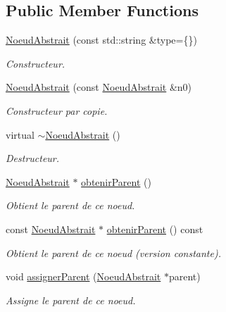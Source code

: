 \subsection*{Public Member Functions}
\begin{DoxyCompactItemize}
\item 
\hyperlink{group__inf2990_gad1eae42fe2bccef56f55b8a52726657f}{Noeud\+Abstrait} (const std\+::string \&type=\{\})
\begin{DoxyCompactList}\small\item\em Constructeur. \end{DoxyCompactList}\item 
\hyperlink{group__inf2990_gae7bea8d23c4dad60c334fc6806d08d01}{Noeud\+Abstrait} (const \hyperlink{class_noeud_abstrait}{Noeud\+Abstrait} \&n0)
\begin{DoxyCompactList}\small\item\em Constructeur par copie. \end{DoxyCompactList}\item 
virtual \hyperlink{group__inf2990_ga0ab3f7ab838e8349113da5074abcdc3a}{$\sim$\+Noeud\+Abstrait} ()
\begin{DoxyCompactList}\small\item\em Destructeur. \end{DoxyCompactList}\item 
\hyperlink{class_noeud_abstrait}{Noeud\+Abstrait} $\ast$ \hyperlink{group__inf2990_gaa2ac8c4cd02d88c312b92c65e07ed6d9}{obtenir\+Parent} ()
\begin{DoxyCompactList}\small\item\em Obtient le parent de ce noeud. \end{DoxyCompactList}\item 
const \hyperlink{class_noeud_abstrait}{Noeud\+Abstrait} $\ast$ \hyperlink{group__inf2990_gaf063d208bc4764b1fd2c4e76ec0469b9}{obtenir\+Parent} () const 
\begin{DoxyCompactList}\small\item\em Obtient le parent de ce noeud (version constante). \end{DoxyCompactList}\item 
void \hyperlink{group__inf2990_ga7787ab59ecc1e6119287459a7154f307}{assigner\+Parent} (\hyperlink{class_noeud_abstrait}{Noeud\+Abstrait} $\ast$parent)
\begin{DoxyCompactList}\small\item\em Assigne le parent de ce noeud. \end{DoxyCompactList}\item 

\end{DoxyCompactItemize}
